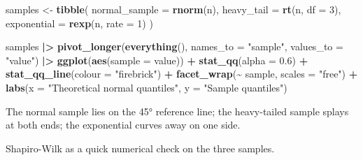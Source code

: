 \documentclass[
]{article}
\newenvironment{Shaded}{\begin{snugshade}}{\end{snugshade}}
\newcommand{\AttributeTok}[1]{\textcolor[rgb]{0.13,0.29,0.53}{#1}}
\newcommand{\DecValTok}[1]{\textcolor[rgb]{0.00,0.00,0.81}{#1}}
\newcommand{\FloatTok}[1]{\textcolor[rgb]{0.00,0.00,0.81}{#1}}
\newcommand{\FunctionTok}[1]{\textcolor[rgb]{0.13,0.29,0.53}{\textbf{#1}}}
\newcommand{\NormalTok}[1]{#1}
\newcommand{\OtherTok}[1]{\textcolor[rgb]{0.56,0.35,0.01}{#1}}
\newcommand{\SpecialCharTok}[1]{\textcolor[rgb]{0.81,0.36,0.00}{\textbf{#1}}}
\newcommand{\StringTok}[1]{\textcolor[rgb]{0.31,0.60,0.02}{#1}}
\begin{document}
\begin{Shaded}
\begin{Highlighting}[]
\NormalTok{samples }\OtherTok{\textless{}{-}} \FunctionTok{tibble}\NormalTok{(}
  \AttributeTok{normal\_sample =} \FunctionTok{rnorm}\NormalTok{(n),}
  \AttributeTok{heavy\_tail    =} \FunctionTok{rt}\NormalTok{(n, }\AttributeTok{df =} \DecValTok{3}\NormalTok{),}
  \AttributeTok{exponential   =} \FunctionTok{rexp}\NormalTok{(n, }\AttributeTok{rate =} \DecValTok{1}\NormalTok{)}
\NormalTok{)}
\end{Highlighting}
\end{Shaded}

\begin{Shaded}
\begin{Highlighting}[]
\NormalTok{samples }\SpecialCharTok{|\textgreater{}}
  \FunctionTok{pivot\_longer}\NormalTok{(}\FunctionTok{everything}\NormalTok{(), }\AttributeTok{names\_to =} \StringTok{"sample"}\NormalTok{, }\AttributeTok{values\_to =} \StringTok{"value"}\NormalTok{) }\SpecialCharTok{|\textgreater{}}
  \FunctionTok{ggplot}\NormalTok{(}\FunctionTok{aes}\NormalTok{(}\AttributeTok{sample =}\NormalTok{ value)) }\SpecialCharTok{+}
  \FunctionTok{stat\_qq}\NormalTok{(}\AttributeTok{alpha =} \FloatTok{0.6}\NormalTok{) }\SpecialCharTok{+}
  \FunctionTok{stat\_qq\_line}\NormalTok{(}\AttributeTok{colour =} \StringTok{"firebrick"}\NormalTok{) }\SpecialCharTok{+}
  \FunctionTok{facet\_wrap}\NormalTok{(}\SpecialCharTok{\textasciitilde{}}\NormalTok{ sample, }\AttributeTok{scales =} \StringTok{"free"}\NormalTok{) }\SpecialCharTok{+}
  \FunctionTok{labs}\NormalTok{(}\AttributeTok{x =} \StringTok{"Theoretical normal quantiles"}\NormalTok{,}
       \AttributeTok{y =} \StringTok{"Sample quantiles"}\NormalTok{)}
\end{Highlighting}
\end{Shaded}

The normal sample lies on the 45° reference line; the heavy-tailed
sample splays at both ends; the exponential curves away on one side.

Shapiro-Wilk as a quick numerical check on the three samples.

\begin{Shaded}
\end{Shaded}
\end{document}
